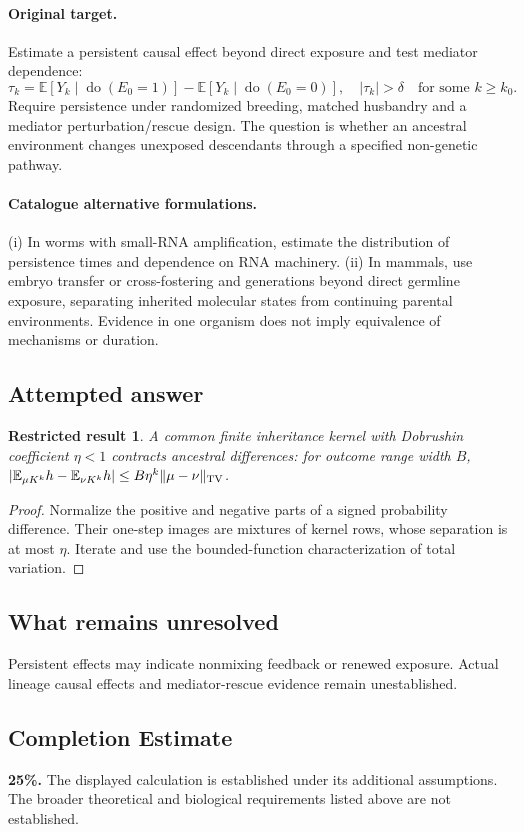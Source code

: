 \documentclass[11pt]{article}
\newcommand{\E}{\mathbb E}
\providecommand{\E}{\mathbb E}
\newtheorem{attemptresult}{Restricted result}[section]
\begin{document}
\paragraph{Original target.}
Estimate a persistent causal effect beyond direct exposure and test mediator dependence:
\[
\tau_k=\E[Y_k\mid\operatorname{do}(E_0=1)]-\E[Y_k\mid\operatorname{do}(E_0=0)],
\quad |\tau_k|>\delta\quad\text{for some }k\geq k_0.
\]
Require persistence under randomized breeding, matched husbandry and a mediator perturbation/rescue design. The question is whether an ancestral environment changes unexposed descendants through a specified non-genetic pathway.
\paragraph{Catalogue alternative formulations.}
(i) In worms with small-RNA amplification, estimate the distribution of persistence times and dependence on RNA machinery. (ii) In mammals, use embryo transfer or cross-fostering and generations beyond direct germline exposure, separating inherited molecular states from continuing parental environments. Evidence in one organism does not imply equivalence of mechanisms or duration.
\subsection{Attempted answer}
\begin{attemptresult}
A common finite inheritance kernel with Dobrushin coefficient $\eta<1$ contracts ancestral differences: for outcome range width $B$, $|\E_{\mu K^k}h-\E_{\nu K^k}h|\leq B\eta^k\|\mu-\nu\|_{\rm TV}$.
\end{attemptresult}
\begin{proof}
Normalize the positive and negative parts of a signed probability difference. Their one-step images are mixtures of kernel rows, whose separation is at most $\eta$. Iterate and use the bounded-function characterization of total variation.
\end{proof}
\subsection{What remains unresolved}
Persistent effects may indicate nonmixing feedback or renewed exposure. Actual lineage causal effects and mediator-rescue evidence remain unestablished.
\subsection{Completion Estimate}
\textbf{25\%.} The displayed calculation is established under its additional assumptions. The broader theoretical and biological requirements listed above are not established.
\end{document}
